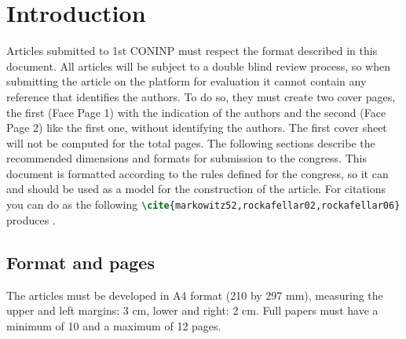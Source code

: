 \documentclass{coninp}
\begin{document}
\begin{abstract}
\textbf{Abstract} 
This document contains indications regarding the format to be respected in the articles to be submitted to 1st CONINP. The content of the article must be comprehensible to most researcher in the area you are submitting. It must be informative, presenting introduction, goals, methodology, results and conclusions. It must consist of a sequence of concise, affirmative sentences and not a list of topics. The verb must be used in the active voice and in the third-person singular. The article must respect the format presented in this model. The abstract should have a minimum of 100 and a maximum of 150 words.\\\\
\textbf{Keywords}: One; Two; Maximum three.
\end{abstract}


\newpage
\section{Introduction}\label{sec-intro}
Articles submitted to 1st CONINP must respect the format described in this document.
All articles will be subject to a double blind review process, so when submitting the article on the platform for evaluation it cannot contain any reference that identifies the authors. To do so, they must create two cover pages, the first (Face Page 1) with the indication of the authors and the second (Face Page 2) like the first one, without identifying the authors. The first cover sheet will not be computed for the total pages.
The following sections describe the recommended dimensions and formats for submission to the congress.
This document is formatted according to the rules defined for the congress, so it can and should be used as a model for the construction of the article.
 For citations you can do as the following \lstinline[language=TeX]/\cite{markowitz52,rockafellar02,rockafellar06}/ produces \cite{markowitz52,rockafellar02,rockafellar06}.

\subsection{Format and pages}
The articles must be developed in A4 format (210 by 297 mm), measuring the upper and left margins: 3 cm, lower and right: 2 cm.
Full papers must have a minimum of 10 and a maximum of 12 pages.
\end{document}
